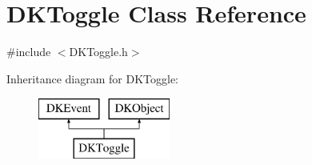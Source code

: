 \hypertarget{class_d_k_toggle}{\section{D\-K\-Toggle Class Reference}
\label{class_d_k_toggle}
}


{\ttfamily \#include $<$D\-K\-Toggle.\-h$>$}

Inheritance diagram for D\-K\-Toggle\-:\begin{figure}[H]
\begin{center}
\leavevmode
\includegraphics[height=2.000000cm]{class_d_k_toggle}
\end{center}
\end{figure}
